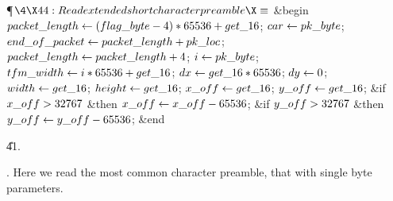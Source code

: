 \Y\P$\4\X44:Read extended short character preamble\X\S$\6
\&{begin} $\\{packet\_length}\gets(\\{flag\_byte}-4)\ast65536+\\{get\_16}$;\5
$\\{car}\gets\\{pk\_byte}$;\5
$\\{end\_of\_packet}\gets\\{packet\_length}+\\{pk\_loc}$;\5
$\\{packet\_length}\gets\\{packet\_length}+4$;\5
$\hbox{$i$}\gets\\{pk\_byte}$;\5
$\\{tfm\_width}\gets\hbox{$i$}\ast65536+\\{get\_16}$;\5
$\\{dx}\gets\\{get\_16}\ast65536$;\5
$\\{dy}\gets0$;\5
$\\{width}\gets\\{get\_16}$;\5
$\\{height}\gets\\{get\_16}$;\5
$\\{x\_off}\gets\\{get\_16}$;\5
$\\{y\_off}\gets\\{get\_16}$;\6
\&{if} $\\{x\_off}>32767$ \1\&{then}\5
$\\{x\_off}\gets\\{x\_off}-65536$;\2\6
\&{if} $\\{y\_off}>32767$ \1\&{then}\5
$\\{y\_off}\gets\\{y\_off}-65536$;\2\6
\&{end}\par
\U41.\fi

. Here we read the most common character preamble, that with single byte
parameters.

